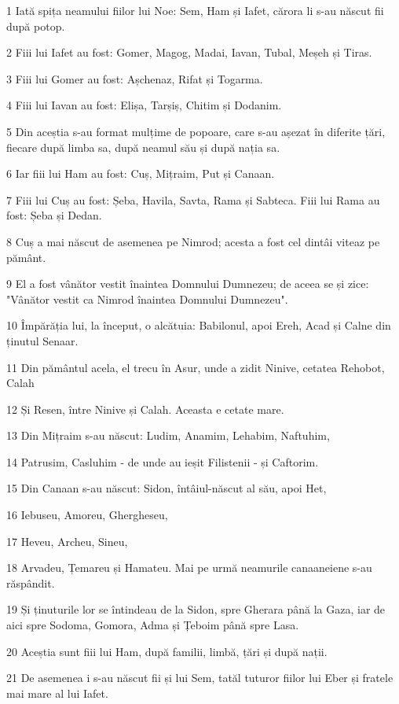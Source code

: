 \par 1 Iată spița neamului fiilor lui Noe: Sem, Ham și Iafet, cărora li s-au născut fii după potop.
\par 2 Fiii lui Iafet au fost: Gomer, Magog, Madai, Iavan, Tubal, Meșeh și Tiras.
\par 3 Fiii lui Gomer au fost: Așchenaz, Rifat și Togarma.
\par 4 Fiii lui Iavan au fost: Elișa, Tarșiș, Chitim și Dodanim.
\par 5 Din aceștia s-au format mulțime de popoare, care s-au așezat în diferite țări, fiecare după limba sa, după neamul său și după nația sa.
\par 6 Iar fiii lui Ham au fost: Cuș, Mițraim, Put și Canaan.
\par 7 Fiii lui Cuș au fost: Șeba, Havila, Savta, Rama și Sabteca. Fiii lui Rama au fost: Șeba și Dedan.
\par 8 Cuș a mai născut de asemenea pe Nimrod; acesta a fost cel dintâi viteaz pe pământ.
\par 9 El a fost vânător vestit înaintea Domnului Dumnezeu; de aceea se și zice: "Vânător vestit ca Nimrod înaintea Domnului Dumnezeu".
\par 10 Împărăția lui, la început, o alcătuia: Babilonul, apoi Ereh, Acad și Calne din ținutul Senaar.
\par 11 Din pământul acela, el trecu în Asur, unde a zidit Ninive, cetatea Rehobot, Calah
\par 12 Și Resen, între Ninive și Calah. Aceasta e cetate mare.
\par 13 Din Mițraim s-au născut: Ludim, Anamim, Lehabim, Naftuhim,
\par 14 Patrusim, Casluhim - de unde au ieșit Filistenii - și Caftorim.
\par 15 Din Canaan s-au născut: Sidon, întâiul-născut al său, apoi Het,
\par 16 Iebuseu, Amoreu, Ghergheseu,
\par 17 Heveu, Archeu, Sineu,
\par 18 Arvadeu, Țemareu și Hamateu. Mai pe urmă neamurile canaaneiene s-au răspândit.
\par 19 Și ținuturile lor se întindeau de la Sidon, spre Gherara până la Gaza, iar de aici spre Sodoma, Gomora, Adma și Țeboim până spre Lasa.
\par 20 Aceștia sunt fiii lui Ham, după familii, limbă, țări și după nații.
\par 21 De asemenea i s-au născut fii și lui Sem, tatăl tuturor fiilor lui Eber și fratele mai mare al lui Iafet.
